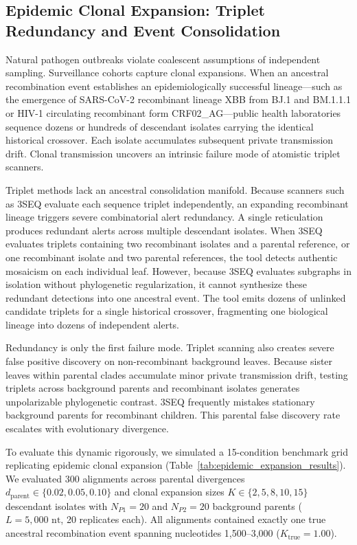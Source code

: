 \subsection{Epidemic Clonal Expansion: Triplet Redundancy and Event Consolidation}
\label{subsec:epidemic_clonal_expansion}

Natural pathogen outbreaks violate coalescent assumptions of independent sampling.
Surveillance cohorts capture clonal expansions.
When an ancestral recombination event establishes an epidemiologically successful lineage---such as the emergence of SARS-CoV-2 recombinant lineage XBB from BJ.1 and BM.1.1.1 or HIV-1 circulating recombinant form CRF02\_AG---public health laboratories sequence dozens or hundreds of descendant isolates carrying the identical historical crossover.
Each isolate accumulates subsequent private transmission drift.
Clonal transmission uncovers an intrinsic failure mode of atomistic triplet scanners.

Triplet methods lack an ancestral consolidation manifold.
Because scanners such as 3SEQ evaluate each sequence triplet independently, an expanding recombinant lineage triggers severe combinatorial alert redundancy.
A single reticulation produces redundant alerts across multiple descendant isolates.
When 3SEQ evaluates triplets containing two recombinant isolates and a parental reference, or one recombinant isolate and two parental references, the tool detects authentic mosaicism on each individual leaf.
However, because 3SEQ evaluates subgraphs in isolation without phylogenetic regularization, it cannot synthesize these redundant detections into one ancestral event.
The tool emits dozens of unlinked candidate triplets for a single historical crossover, fragmenting one biological lineage into dozens of independent alerts.

Redundancy is only the first failure mode.
Triplet scanning also creates severe false positive discovery on non-recombinant background leaves.
Because sister leaves within parental clades accumulate minor private transmission drift, testing triplets across background parents and recombinant isolates generates unpolarizable phylogenetic contrast.
3SEQ frequently mistakes stationary background parents for recombinant children.
This parental false discovery rate escalates with evolutionary divergence.

To evaluate this dynamic rigorously, we simulated a 15-condition benchmark grid replicating epidemic clonal expansion (Table~\ref{tab:epidemic_expansion_results}).
We evaluated 300 alignments across parental divergences $d_{\text{parent}} \in \{0.02, 0.05, 0.10\}$ and clonal expansion sizes $K \in \{2, 5, 8, 10, 15\}$ descendant isolates with $N_{P1} = 20$ and $N_{P2} = 20$ background parents ($L = 5,000\text{ nt}$, 20 replicates each).
All alignments contained exactly one true ancestral recombination event spanning nucleotides 1,500--3,000 ($K_{\text{true}} = 1.00$).

